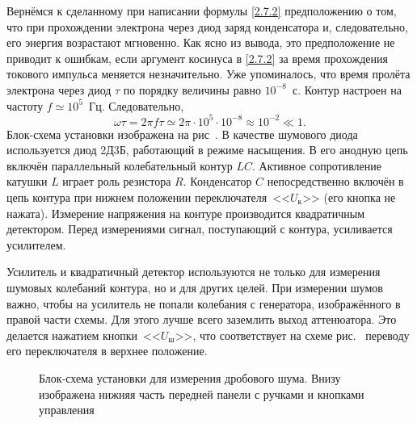 Вернёмся к сделанному при написании формулы \eqref{2.7.2} предположению о том, что при прохождении электрона через диод заряд
конденсатора и, следовательно, его энергия возрастают мгновенно. Как ясно из вывода, это предположение не приводит к
ошибкам, если аргумент косинуса в \eqref{2.7.2} за время прохождения токового импульса меняется незначительно. Уже
упоминалось, что время пролёта электрона через диод $\tau$ по порядку величины равно $10^{-8}$~с. Контур настроен на
частоту $f\simeq10^5$~Гц. Следовательно,
\begin{equation*}
\omega\tau=2\pi f\tau\simeq2\pi\cdot 10^5\cdot 10^{-8}\approx10^{-2}\ll1.
\end{equation*}
\experiment
Блок-схема установки изображена на рис~. В качестве шумового диода используется диод 2Д3Б, работающий в
режиме насыщения. В его анодную цепь включён параллельный колебательный контур $LC$. Активное сопротивление катушки $L$
играет роль резистора $R$. Конденсатор $C$ непосредственно включён в цепь контура при нижнем положении
переключателя~<<$U_{\text{к}}$>> (его кнопка не нажата). Измерение напряжения на контуре производится квадратичным детектором.
Перед измерениями сигнал, поступающий с контура, усиливается усилителем.

Усилитель и квадратичный детектор используются не только для измерения шумовых колебаний контура, но и для других целей.
При измерении шумов важно, чтобы на усилитель не попали колебания с генератора, изображённого в правой части схемы. Для
этого лучше всего заземлить выход аттенюатора. Это делается нажатием кнопки~<<$U_{\text{ш}}$>>, что соответствует на схеме
рис.~ переводу его переключателя в верхнее положение.

\begin{figure}[h!]
	\caption{Блок-схема установки для измерения дробового шума. Внизу изображена нижняя часть передней панели с ручками и кнопками управления}
\end{figure}

